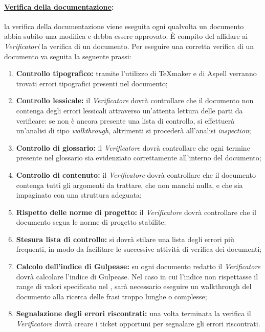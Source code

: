 \paragraph{\underline{Verifica della documentazione}:}
la verifica della documentazione viene eseguita ogni qualvolta un documento abbia subito una modifica e debba essere approvato. È compito del \projectManager{} affidare ai \emph{Verificatori} la verifica di un documento.
Per eseguire una corretta verifica di un documento va seguita la seguente prassi:
\begin{enumerate}
\item \textbf{Controllo tipografico:} tramite l'utilizzo di \TeX{}maker e di Aspell\g{} verranno trovati errori tipografici presenti nel documento;
\item \textbf{Controllo lessicale:} il \emph{Verificatore} dovrà controllare che il documento non contenga degli errori lessicali attraverso un'attenta lettura delle parti da verificare: se non è ancora presente una lista di controllo, si effettuerà un'analisi di tipo \textit{walkthrough}, altrimenti si procederà all'analisi \textit{inspection};
\item \textbf{Controllo di glossario:} il \emph{Verificatore} dovrà controllare che ogni termine presente nel glossario sia evidenziato correttamente all'interno del documento;
\item \textbf{Controllo di contenuto:} il \emph{Verificatore} dovrà controllare che il documento contenga tutti gli argomenti da trattare, che non manchi nulla, e che sia impaginato con una struttura adeguata;
\item \textbf{Rispetto delle norme di progetto:} il \emph{Verificatore} dovrà controllare che il documento segua le norme di progetto stabilite;
\item \textbf{Stesura lista di controllo:} si dovrà stilare una lista degli errori più frequenti, in modo da facilitare le successive attività di verifica dei documenti;
\item \textbf{Calcolo dell'indice di Gulpease:} su ogni documento redatto il \emph{Verificatore} dovrà calcolare l’indice di Gulpease. Nel caso in cui l’indice non rispettasse il range di valori specificato nel \PdQ, sarà necessario eseguire un walkthrough del documento alla ricerca delle frasi troppo lunghe o complesse;
\item \textbf{Segnalazione degli errori riscontrati:} una volta terminata la verifica il \emph{Verificatore} dovrà creare i ticket opportuni per segnalare gli errori riscontrati.
\end{enumerate}

